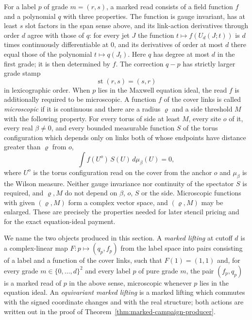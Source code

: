 For a label $p$ of grade $m=(r,s)$, a marked read consists of a field
function $f$ and a polynomial $q$ with three properties. The function is
gauge invariant, has at least $s$ slot factors in the span sense above,
and its link-action derivatives through order $d$ agree with those of $q$:
for every jet $J$ the function $t\mapsto f(U_d(J;t))$ is $d$ times
continuously differentiable at $0$, and its derivatives of order at most
$d$ there equal those of the polynomial $t\mapsto q(J_t)$. Here $q$ has
degree at most $d$ in the first grade; it is then determined by $f$.
The correction $q-p$ has strictly larger grade stamp
\[
                         \operatorname{st}(r,s)=(s,r)
\]
in lexicographic order. When $p$ lies in the Maxwell equation ideal, the
read $f$ is additionally required to be microscopic. A function $f$ of the
cover links is called \emph{microscopic} if it is continuous and there are
a radius $\varrho$ and a side threshold $M$ with the following property. For
every torus of side at least $M$, every site $o$ of it, every real
$\beta\ne0$, and every bounded measurable function $S$ of the torus
configuration which depends only on links both of whose endpoints have
distance greater than $\varrho$ from $o$,
\[
        \int f(U^{o})\,S(U)\,d\mu_\beta(U)=0 ,
\]
where $U^{o}$ is the torus configuration read on the cover from the
anchor $o$ and $\mu_\beta$ is the Wilson measure. Neither gauge
invariance nor continuity of the spectator $S$ is required, and
$\varrho,M$ do not depend on $\beta$, $o$, $S$ or the side. Microscopic
functions with given $(\varrho,M)$ form a complex vector space, and
$(\varrho,M)$ may be enlarged.
These are precisely the properties needed for later stencil pricing and
for the exact equation-ideal payment.

We name the two objects produced in this section. A \emph{marked lifting} at
cutoff $d$ is a complex-linear map $F:p\mapsto(q_p,f_p)$ from the label
space into pairs consisting of a label and a function of the cover links,
such that $F(1)=(1,1)$ and, for every grade
$m\in\{0,\ldots,d\}^2$ and every label $p$ of pure grade $m$, the pair
$(f_p,q_p)$ is a marked read of $p$ in the above sense, microscopic
whenever $p$ lies in the equation ideal. An \emph{equivariant marked lifting} is a marked lifting
which commutes with the signed coordinate changes and with the real
structure; both actions are written out in the proof of
Theorem~\ref{thm:marked-campaign-producer}.

